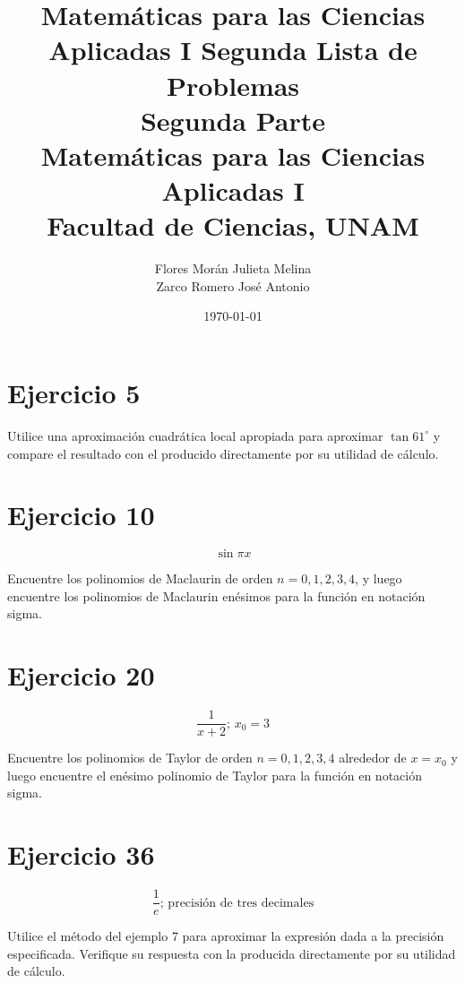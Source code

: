 \documentclass[12pt]{article}
\title{Matemáticas para las Ciencias Aplicadas I}
\title{
	Segunda Lista de Problemas \\
	\textbf{Segunda Parte} \\
	\vspace{1ex}
	\large Matemáticas para las Ciencias Aplicadas I \\
	Facultad de Ciencias, UNAM}
\date{\today}
\author{Flores Morán Julieta Melina \\ Zarco Romero José Antonio}
\begin{document}
\maketitle


\section{Ejercicio 5} 
Utilice una aproximación cuadrática local apropiada para aproximar $\tan 61^{\circ}$ y compare el resultado con el producido directamente por su utilidad de cálculo.

\section{Ejercicio 10}
\[\sin \pi x\]

Encuentre los polinomios de Maclaurin de orden $n = 0, 1, 2, 3, 4$, y luego encuentre los polinomios de Maclaurin enésimos para la función en notación sigma.

\section{Ejercicio 20}
\[\frac{1}{x+2}\text{; }x_0=3\]

Encuentre los polinomios de Taylor de orden $n = 0, 1, 2, 3, 4$ alrededor de $x = x_0$ y luego encuentre el enésimo polinomio de Taylor para la función en notación sigma.

\section{Ejercicio 36}
\[\frac{1}{e}\text{; precisión de tres decimales}\]

Utilice el método del ejemplo 7 para aproximar la expresión dada a la precisión especificada. Verifique su respuesta con la producida directamente por su utilidad de cálculo.

\end{document}
